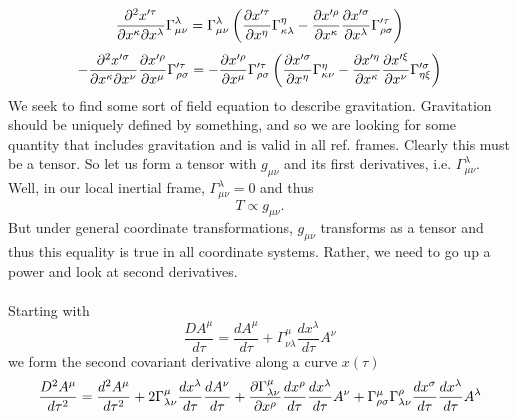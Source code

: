 \documentclass[10pt,letterpaper]{article}
\begin{document}
\[
	\frac{\pd^2 x'^\tau}{\pd x^\kappa \pd x^\lambda}\Gamma^\lambda_{\mu\nu} = \Gamma^\lambda_{\mu\nu} 
	\plr{\pdiff[x'^\tau]{x^\eta}\Gamma^{\eta}_{\kappa \lambda}
	- \pdiff[x'^\rho]{x^\kappa}\pdiff[x'^\sigma]{x^\lambda}\Gamma'^\tau_{\rho\sigma}}
\]
\[
	-\frac{\pd^2 x'^\sigma}{\pd x^\kappa \pd x^\nu}\frac{\pd x'^\rho}{\pd x^\mu}
	\Gamma'^\tau_{\rho\sigma} = -\frac{\pd x'^\rho}{\pd x^\mu}
	\Gamma'^\tau_{\rho\sigma}
	\plr{\pdiff[x'^\sigma]{x^\eta}\Gamma^{\eta}_{\kappa \nu}
	- \pdiff[x'^\eta]{x^\kappa}\pdiff[x'^\xi]{x^\nu}\Gamma'^\sigma_{\eta\xi}}
\]
We seek to find some sort of field equation to describe gravitation. Gravitation should be uniquely defined by something,
and so we are looking for some quantity that includes gravitation and is valid in all ref. frames. Clearly this must be 
a tensor. So let us form a tensor with $g_{\mu \nu}$ and its first derivatives, i.e. $\Gamma^\lambda_{\mu\nu}$. Well,
in our local inertial frame, $\Gamma^\lambda_{\mu\nu} = 0$ and thus
\[
	T \propto g_{\mu\nu}.
\]
But under general coordinate transformations, $g_{\mu\nu}$ transforms as a tensor and thus this equality is true
in all coordinate systems. Rather, we need to go up a power and look at second derivatives. 
\\ \\
Starting with
\[
	\frac{DA^\mu}{d\tau} = \frac{dA^\mu}{d\tau} + \Gamma^\mu_{\nu\lambda}\frac{dx^\lambda}{d\tau}A^\nu
\]
we form the second covariant derivative along a curve $x(\tau)$
\[
	\frac{ D^2 A^\mu}{d\tau^2} = \frac{d^2 A^\mu}{d\tau^2} + 2\Gamma^\mu_{\lambda\nu}\frac{dx^\lambda}{d\tau}
	\frac{dA^\nu}{d\tau}+\frac{\pd\Gamma^\mu_{\lambda\nu}}{\pd x^\rho}\frac{dx^\rho}{d\tau}\frac{dx^\lambda}{d\tau}
	A^\nu + \Gamma^\mu_{\rho\sigma}\Gamma^\rho_{\lambda\nu} \frac{dx^\sigma}{d\tau}\frac{dx^\lambda}{d\tau}
	A^\lambda
\]
	
\end{document}
